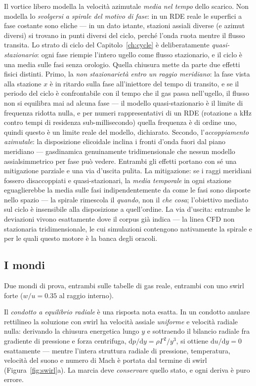 Il vortice libero modella la velocità azimutale \emph{media nel
tempo} dello scarico. Non modella lo \emph{svolgersi a spirale del
motivo di fase}: in un RDE reale le superfici a fase costante sono
eliche --- in un dato istante, stazioni assiali diverse (e azimut
diversi) si trovano in punti diversi del ciclo, perché l'onda ruota
mentre il flusso transita. Lo strato di ciclo del
Capitolo~\ref{ch:cycle} è deliberatamente \emph{quasi-stazionario}:
ogni fase riempie l'intero ugello come flusso stazionario, e il ciclo
è una media sulle fasi senza orologio. Quella chiusura mette da parte
due effetti fisici distinti. Primo, la \emph{non stazionarietà entro
un raggio meridiano}: la fase vista alla stazione $x$ è in ritardo
sulla fase all'iniettore del tempo di transito, e se il periodo del
ciclo è confrontabile con il tempo che il gas passa nell'ugello, il
flusso non si equilibra mai ad alcuna fase --- il modello
quasi-stazionario è il limite di frequenza ridotta nulla, e per
numeri rappresentativi di un RDE (rotazione a kHz contro tempi di
residenza sub-millisecondo) quella frequenza è di ordine uno, quindi
questo è un limite reale del modello, dichiarato. Secondo,
l'\emph{accoppiamento azimutale}: la disposizione elicoidale inclina
i fronti d'onda fuori dal piano meridiano --- gasdinamica
genuinamente tridimensionale che nessun modello assialsimmetrico per
fase può vedere. Entrambi gli effetti portano con sé una mitigazione
parziale e una via d'uscita pulita. La mitigazione: se i raggi
meridiani fossero disaccoppiati e quasi-stazionari, la \emph{media
temporale} in ogni stazione eguaglierebbe la media sulle fasi
indipendentemente da come le fasi sono disposte nello spazio --- la
spirale rimescola il \emph{quando}, non il \emph{che cosa};
l'obiettivo mediato sul ciclo è insensibile alla disposizione a
quell'ordine. La via d'uscita: entrambe le deviazioni vivono
esattamente dove il corpus già indica --- la linea CFD non
stazionaria tridimensionale, le cui simulazioni contengono
nativamente la spirale e per le quali questo motore è la banca degli
oracoli.

\subsection{I mondi}

Due mondi di prova, entrambi sulle tabelle di gas reale, entrambi con
uno swirl forte ($w/u = 0.35$ al raggio interno).

Il \emph{condotto a equilibrio radiale} è una risposta nota esatta.
In un condotto anulare rettilineo la soluzione con swirl ha velocità
assiale \emph{uniforme} e velocità radiale nulla: derivando la
chiusura energetica lungo $y$ e sottraendo il bilancio radiale fra
gradiente di pressione e forza centrifuga,
$\mathrm{d}p/\mathrm{d}y = \rho\Gamma^2/y^3$, si ottiene
$\mathrm{d}u/\mathrm{d}y = 0$ esattamente --- mentre l'intera
struttura radiale di pressione, temperatura, velocità del suono e
numero di Mach è portata dal termine di swirl
(Figura~\ref{fig:swirl}a). La marcia deve \emph{conservare} quello
stato, e ogni deriva è puro errore.


